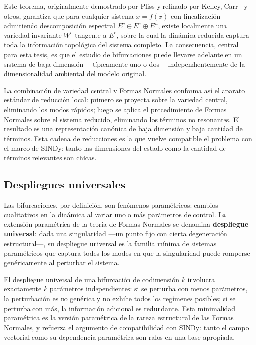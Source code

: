 Este teorema, originalmente demostrado por Pliss y refinado por Kelley, Carr~\cite{carr1981} y otros, garantiza que para cualquier sistema $\dot{x} = f(x)$ con linealización admitiendo descomposición espectral $E^c \oplus E^s \oplus E^u$, existe localmente una variedad invariante $W^c$ tangente a $E^c$, sobre la cual la dinámica reducida captura toda la información topológica del sistema completo. La consecuencia, central para esta tesis, es que el estudio de bifurcaciones puede llevarse adelante en un sistema de baja dimensión —típicamente uno o dos— independientemente de la dimensionalidad ambiental del modelo original.

La combinación de variedad central y Formas Normales conforma así el aparato estándar de reducción local: primero se proyecta sobre la variedad central, eliminando los modos rápidos; luego se aplica el procedimiento de Formas Normales sobre el sistema reducido, eliminando los términos no resonantes. El resultado es una representación canónica de baja dimensión y baja cantidad de términos. Esta cadena de reducciones es la que vuelve compatible el problema con el marco de SINDy: tanto las dimensiones del estado como la cantidad de términos relevantes son chicas.

\subsection{Despliegues universales}

Las bifurcaciones, por definición, son fenómenos paramétricos: cambios cualitativos en la dinámica al variar uno o más parámetros de control. La extensión paramétrica de la teoría de Formas Normales se denomina \textbf{despliegue universal}: dada una singularidad —un punto fijo con cierta degeneración estructural—, su despliegue universal es la familia mínima de sistemas paramétricos que captura todos los modos en que la singularidad puede romperse genéricamente al perturbar el sistema.

El despliegue universal de una bifurcación de codimensión $k$ involucra exactamente $k$ parámetros independientes: si se perturba con menos parámetros, la perturbación es no genérica y no exhibe todos los regímenes posibles; si se perturba con más, la información adicional es redundante. Esta minimalidad paramétrica es la versión paramétrica de la rareza estructural de las Formas Normales, y refuerza el argumento de compatibilidad con SINDy: tanto el campo vectorial como su dependencia paramétrica son ralos en una base apropiada.

